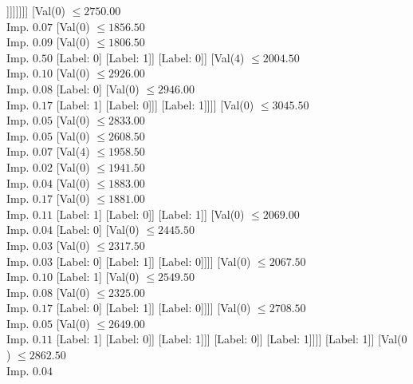 \documentclass[margin=10pt]{standalone}
\begin{document}
\begin{forest}
																[Label: 0]]]]]]]]
									[Val($0$) $ \leq 2750.00$ \\ Imp. $0.07$
										[Val($0$) $ \leq 1856.50$ \\ Imp. $0.09$
											[Val($0$) $ \leq 1806.50$ \\ Imp. $0.50$
												[Label: 0]
												[Label: 1]]
											[Label: 0]]
										[Val($4$) $ \leq 2004.50$ \\ Imp. $0.10$
											[Val($0$) $ \leq 2926.00$ \\ Imp. $0.08$
												[Label: 0]
												[Val($0$) $ \leq 2946.00$ \\ Imp. $0.17$
													[Label: 1]
													[Label: 0]]]
											[Label: 1]]]]
								[Val($0$) $ \leq 3045.50$ \\ Imp. $0.05$
									[Val($0$) $ \leq 2833.00$ \\ Imp. $0.05$
										[Val($0$) $ \leq 2608.50$ \\ Imp. $0.07$
											[Val($4$) $ \leq 1958.50$ \\ Imp. $0.02$
												[Val($0$) $ \leq 1941.50$ \\ Imp. $0.04$
													[Val($0$) $ \leq 1883.00$ \\ Imp. $0.17$
														[Val($0$) $ \leq 1881.00$ \\ Imp. $0.11$
															[Label: 1]
															[Label: 0]]
														[Label: 1]]
													[Val($0$) $ \leq 2069.00$ \\ Imp. $0.04$
														[Label: 0]
														[Val($0$) $ \leq 2445.50$ \\ Imp. $0.03$
															[Val($0$) $ \leq 2317.50$ \\ Imp. $0.03$
																[Label: 0]
																[Label: 1]]
															[Label: 0]]]]
												[Val($0$) $ \leq 2067.50$ \\ Imp. $0.10$
													[Label: 1]
													[Val($0$) $ \leq 2549.50$ \\ Imp. $0.08$
														[Val($0$) $ \leq 2325.00$ \\ Imp. $0.17$
															[Label: 0]
															[Label: 1]]
														[Label: 0]]]]
											[Val($0$) $ \leq 2708.50$ \\ Imp. $0.05$
												[Val($0$) $ \leq 2649.00$ \\ Imp. $0.11$
													[Label: 1]
													[Label: 0]]
												[Label: 1]]]
										[Label: 0]]
									[Label: 1]]]]
						[Label: 1]]
					[Val($0$) $ \leq 2862.50$ \\ Imp. $0.04$

\end{forest}
\end{document}
